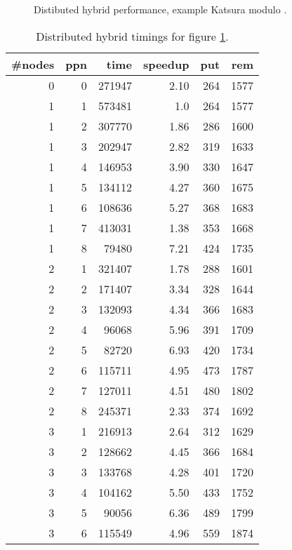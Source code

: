 \documentclass[10pt,twocolumn,a4paper]{article}
\begin{document}
\begin{figure}[thb]
\centering
{}
\caption{Distibuted hybrid performance, example Katsura modulo .}
\label{fig:k8m1hybrid}
\end{figure}

\begin{table}[thb]
\centering
\caption{Distributed hybrid timings for figure \ref{fig:k8m1hybrid}.}
\label{fig:kat8_distm1}
\small{
\clearpage{}
\begin{tabular}{|r|r|r|r|r|r|}
\hline
\#nodes & ppn & time & speedup & put & rem 
\\ \hline
 0 & 0 & 271947 & 2.10 & 264 & 1577
\\ \hline
 1 & 1 & 573481 & 1.0 & 264 & 1577
\\ \hline
 1 & 2 & 307770 & 1.86 & 286 & 1600
\\ \hline
 1 & 3 & 202947 & 2.82 & 319 & 1633
\\ \hline
 1 & 4 & 146953 & 3.90 & 330 & 1647
\\ \hline
 1 & 5 & 134112 & 4.27 & 360 & 1675
\\ \hline
 1 & 6 & 108636 & 5.27 & 368 & 1683
\\ \hline
 1 & 7 & 413031 & 1.38 & 353 & 1668
\\ \hline
 1 & 8 & 79480  & 7.21 & 424 & 1735
\\ \hline
 2 & 1 & 321407 & 1.78 & 288 & 1601
\\ \hline
 2 & 2 & 171407 & 3.34 & 328 & 1644
\\ \hline
 2 & 3 & 132093 & 4.34 & 366 & 1683
\\ \hline
 2 & 4 & 96068  & 5.96 & 391 & 1709
\\ \hline
 2 & 5 & 82720  & 6.93 & 420 & 1734
\\ \hline
 2 & 6 & 115711 & 4.95 & 473 & 1787
\\ \hline
 2 & 7 & 127011 & 4.51 & 480 & 1802
\\ \hline
 2 & 8 & 245371 & 2.33 & 374 & 1692
\\ \hline
 3 & 1 & 216913 & 2.64 & 312 & 1629
\\ \hline
 3 & 2 & 128662 & 4.45 & 366 & 1684
\\ \hline
 3 & 3 & 133768 & 4.28 & 401 & 1720
\\ \hline
 3 & 4 & 104162 & 5.50 & 433 & 1752
\\ \hline
 3 & 5 & 90056  & 6.36 & 489 & 1799
\\ \hline
 3 & 6 & 115549 & 4.96 & 559 & 1874

\end{tabular}}
\end{table}
\end{document}

